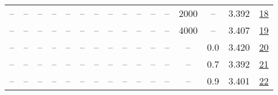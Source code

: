 \begin{table}[H]
\begin{tabular}{cccccccccccccccc}
-- & -- & -- & -- & -- & -- & -- & -- & -- & -- & -- & -- & 2000 & -- & 3.392 & \href{https://wandb.ai/stanford-mercury/optimizer-scaling/runs/sweep-130m-5B-kron3d8947lr0.002-wd0.5-b10.95-plr0.2-pis1-gn1-nor-b13176}{18} \\
-- & -- & -- & -- & -- & -- & -- & -- & -- & -- & -- & -- & 4000 & -- & 3.407 & \href{https://wandb.ai/stanford-mercury/optimizer-scaling/runs/sweep-130m-5B-kron16e6c3lr0.002-wd0.5-b10.95-plr0.2-pis1-gn1-nor-d79e88}{19} \\
-- & -- & -- & -- & -- & -- & -- & -- & -- & -- & -- & -- & -- & 0.0 & 3.420 & \href{https://wandb.ai/stanford-mercury/optimizer-scaling/runs/sweep-130m-5B-kron7554eclr0.002-wd0.0-b10.95-plr0.2-pis1-gn1-nor-068703}{20} \\
-- & -- & -- & -- & -- & -- & -- & -- & -- & -- & -- & -- & -- & 0.7 & 3.392 & \href{https://wandb.ai/stanford-mercury/optimizer-scaling/runs/sweep-130m-5B-kron21448alr0.002-wd0.7-b10.95-plr0.2-pis1-gn1-nor-9b5416}{21} \\
-- & -- & -- & -- & -- & -- & -- & -- & -- & -- & -- & -- & -- & 0.9 & 3.401 & \href{https://wandb.ai/stanford-mercury/optimizer-scaling/runs/sweep-130m-5B-kron8b782elr0.002-wd0.9-b10.95-plr0.2-pis1-gn1-nor-f63969}{22} \\
\bottomrule
\end{tabular}
\end{table}

